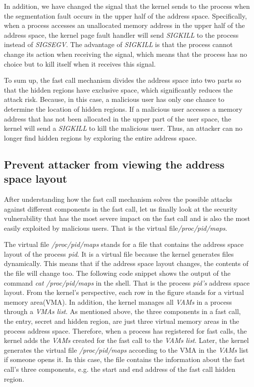 In addition, we have changed the signal that the kernel 
sends to the process when the segmentation fault occurs 
in the upper half of the address space. Specifically, 
when a process accesses an unallocated memory address 
in the upper half of the address space, the kernel page 
fault handler will send \emph{SIGKILL} to the process instead 
of \emph{SIGSEGV}. The advantage of \emph{SIGKILL} is that the process 
cannot change its action when receiving the signal, which means 
that the process has no choice but to kill itself 
when it receives this signal.

To sum up, the fast call mechanism divides the address space 
into two parts so that the hidden regions have exclusive space,
which significantly reduces the attack risk. Because, in this 
case, a malicious user has only one chance to determine the 
location of hidden regions.  If a malicious user accesses a 
memory address that has not been allocated in the upper part
of the user space, the kernel will send a \emph{SIGKILL} to kill 
the malicious user. Thus, an attacker can no longer find hidden 
regions by exploring the entire address space.


\subsection{Prevent attacker from viewing the address space layout}

After understanding how the fast call mechanism solves the possible attacks 
against different components in the fast call, let us finally look at the security 
vulnerability that has the most severe impact on the fast call and is also the most 
easily exploited by malicious users. That is the virtual file\emph{/proc/pid/maps}\cite{23}. 

The virtual file \emph{/proc/pid/maps} stands for a file that contains the address 
space layout of the process \emph{pid}. It is a virtual file because the kernel generates 
files dynamically. This means that if the address space layout changes, the contents 
of the file will change too. The following code snippet shows the output of the 
command  \emph{cat /proc/pid/maps} in the shell. That is the process \emph{pid’s} address space layout. 
From the kernel’s perspective, each row in the figure stands for a virtual memory area(VMA). 
In addition, the kernel manages all \emph{VAMs}\cite{10.5555/983550} in a process through a \emph{VMAs list}. As mentioned above, 
the three components in a fast call, the entry, secret and hidden region, are just three 
virtual memory areas in the process address space. Therefore, when a process has registered 
for fast calls, the kernel adds the \emph{VAMs} created for the fast call to the \emph{VAMs list}. 
Later, the kernel generates the virtual file \emph{/proc/pid/maps} according to the VMA in the 
\emph{VAMs} list if someone opens it. In this case, the file contains the information about 
the fast call's three components, e.g. the start and end address of the fast call hidden region. 


